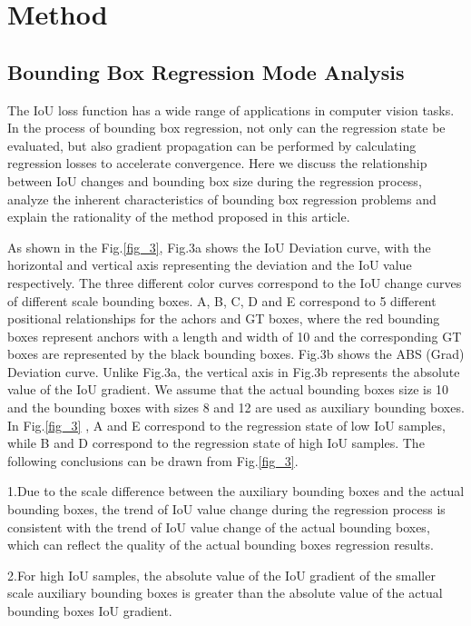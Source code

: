 \documentclass[lettersize,journal]{IEEEtran}
\begin{document}
	\section{Method}
	\subsection{Bounding Box Regression Mode Analysis}
	\par The IoU loss function has a wide range of applications in computer vision tasks. In the process of bounding box regression, not only can the regression state be evaluated, but also gradient propagation can be performed by calculating regression losses to accelerate convergence. Here we discuss the relationship between IoU changes and bounding box size during the regression process\cite{ref8}, analyze the inherent characteristics of bounding box regression problems and explain the rationality of the method proposed in this article.
	\par As shown in the Fig.\ref{fig_3}, Fig.3a shows the IoU Deviation curve, with the horizontal and vertical axis representing the deviation and the IoU value respectively. The three different color curves correspond to the IoU change curves of different scale bounding boxes. A, B, C, D and E correspond to 5 different positional relationships for the achors and GT boxes, where the red bounding boxes represent anchors with a length and width of 10 and the corresponding GT boxes are represented by the black bounding boxes. Fig.3b shows the ABS (Grad) Deviation curve. Unlike Fig.3a, the vertical axis in Fig.3b represents the absolute value of the IoU gradient.
	We assume that the actual bounding boxes size is 10 and the bounding boxes with sizes 8 and 12 are used as auxiliary bounding boxes. In Fig.\ref{fig_3} , A and E correspond to the regression state of low IoU samples, while B and D correspond to the regression state of high IoU samples. The following conclusions can be drawn from Fig.\ref{fig_3}.
	\par 1.Due to the scale difference between the auxiliary bounding boxes and the actual bounding boxes, the trend of IoU value change during the regression process is consistent with the trend of IoU value change of the actual bounding boxes, which can reflect the quality of the actual bounding boxes regression results.
	\par 2.For high IoU samples, the absolute value of the IoU gradient of the smaller scale auxiliary bounding boxes is greater than the absolute value of the actual bounding boxes IoU gradient.
\end{document}
